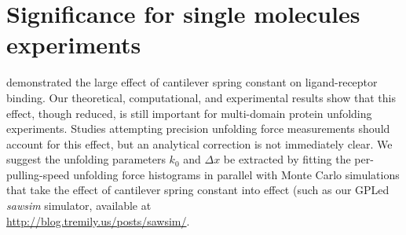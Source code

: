 \section{Significance for single molecules experiments}
\label{sec:cantilever:discussion}

\citet{walton08} demonstrated the large effect of cantilever spring
constant on ligand-receptor binding.  Our theoretical, computational,
and experimental results show that this effect, though reduced, is
still important for multi-domain protein unfolding experiments.
Studies attempting precision unfolding force measurements should
account for this effect, but an analytical correction is not
immediately clear.  We suggest the unfolding parameters $k_0$ and
$\Delta x$ be extracted by fitting the per-pulling-speed unfolding
force histograms in parallel with Monte Carlo simulations that take
the effect of cantilever spring constant into effect (such as our
GPLed \emph{sawsim} simulator, available at\\
\url{http://blog.tremily.us/posts/sawsim/}.
